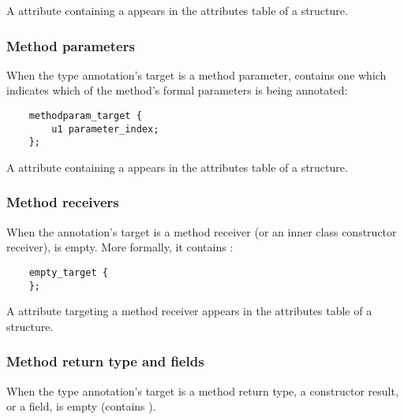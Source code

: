 \documentclass[10pt]{article}
\begin{document}
A \RuntimeInOrVisibleTypeAnnotations attribute containing a
 appears in the attributes table of a
 structure.

\subsubsection{Method parameters\label{class-file:ext:ri:parameters}}

When the type annotation's target is a method parameter,
 contains one  which
indicates which of the method's formal parameters is being annotated:

\begin{Verbatim}
    methodparam_target {
        u1 parameter_index;
    };
\end{Verbatim}

A \RuntimeInOrVisibleTypeAnnotations attribute containing a
 appears in the attributes table of a
 structure.

\subsubsection{Method receivers\label{class-file:ext:ri:receiver}}

When the annotation's target is a method receiver (or an inner class
constructor receiver),  is empty.  More formally, it
contains :

\begin{Verbatim}
    empty_target {
    };
\end{Verbatim}


A \RuntimeInOrVisibleTypeAnnotations attribute targeting
a method receiver appears in the attributes table of a
 structure.




\subsubsection{Method return type and fields\label{class-file:ext:ri:return}}

When the type annotation's target is a method return type, a constructor
result, or a field,  is empty (contains ).
\end{document}
